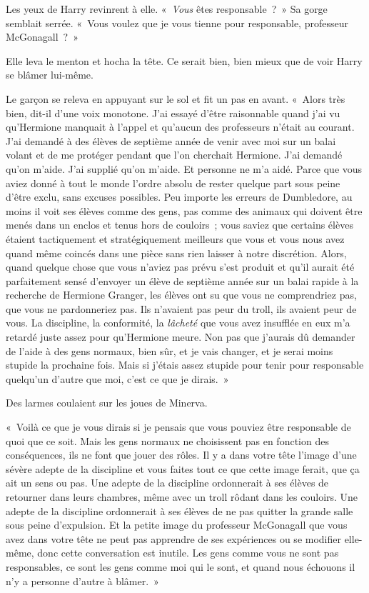 Les yeux de Harry revinrent à elle.
«~\emph{Vous} êtes responsable~?~»
Sa gorge semblait serrée.
«~Vous voulez que je vous tienne pour responsable, professeur McGonagall~?~»

Elle leva le menton et hocha la tête.
Ce serait bien, bien mieux que de voir Harry se blâmer lui-même.

Le garçon se releva en appuyant sur le sol et fit un pas en avant.
«~Alors très bien, dit-il d'une voix monotone.
J'ai essayé d'être raisonnable quand j'ai vu qu'Hermione manquait à l'appel et qu'aucun des professeurs n'était au courant.
J'ai demandé à des élèves de septième année de venir avec moi sur un balai volant et de me protéger pendant que l'on cherchait Hermione.
J'ai demandé qu'on m'aide.
J'ai supplié qu'on m'aide.
Et personne ne m'a aidé.
Parce que vous aviez donné à tout le monde l'ordre absolu de rester quelque part sous peine d'être exclu, sans excuses possibles.
Peu importe les erreurs de Dumbledore, au moins il voit ses élèves comme des gens, pas comme des animaux qui doivent être menés dans un enclos et tenus hors de couloirs~; vous saviez que certains élèves étaient tactiquement et stratégiquement meilleurs que vous et vous nous avez quand même coincés dans une pièce sans rien laisser à notre discrétion.
Alors, quand quelque chose que vous n'aviez pas prévu s'est produit et qu'il aurait été parfaitement sensé d'envoyer un élève de septième année sur un balai rapide à la recherche de Hermione Granger, les élèves ont su que vous ne comprendriez pas, que vous ne pardonneriez pas.
Ils n'avaient pas peur du troll, ils avaient peur de vous.
La discipline, la conformité, la \emph{lâcheté} que vous avez insufflée en eux m'a retardé juste assez pour qu'Hermione meure.
Non pas que j'aurais dû demander de l'aide à des gens normaux, bien sûr, et je vais changer, et je serai moins stupide la prochaine fois.
Mais si j'étais assez stupide pour tenir pour responsable quelqu'un d'autre que moi, c'est ce que je dirais.~»

Des larmes coulaient sur les joues de Minerva.

«~Voilà ce que je vous dirais si je pensais que vous pouviez être responsable de quoi que ce soit.
Mais les gens normaux ne choisissent pas en fonction des conséquences, ils ne font que jouer des rôles.
Il y a dans votre tête l'image d'une sévère adepte de la discipline et vous faites tout ce que cette image ferait, que ça ait un sens ou pas.
Une adepte de la discipline ordonnerait à ses élèves de retourner dans leurs chambres, même avec un troll rôdant dans les couloirs.
Une adepte de la discipline ordonnerait à ses élèves de ne pas quitter la grande salle sous peine d'expulsion.
Et la petite image du professeur McGonagall que vous avez dans votre tête ne peut pas apprendre de ses expériences ou se modifier elle-même, donc cette conversation est inutile.
Les gens comme vous ne sont pas responsables, ce sont les gens comme moi qui le sont, et quand nous échouons il n'y a personne d'autre à blâmer.~»

